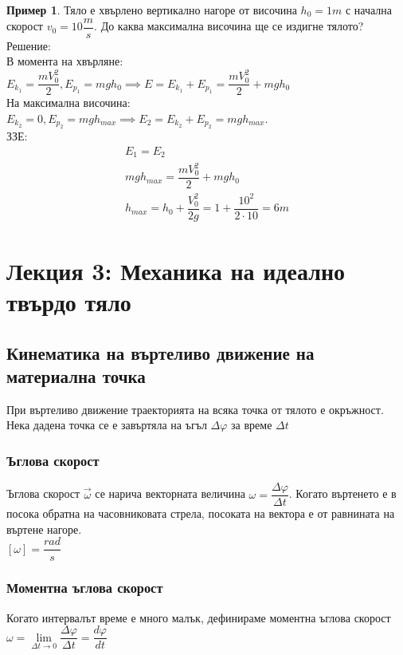 \documentclass[fleqn, 12pt]{article}
\theoremstyle{definition}
\newtheorem{example}{Пример}[subsection]
\begin{document}
\begin{example}
Тяло е хвърлено вертикално нагоре от височина $h_0 =  1m$ с начална скорост $v_0 = 10 \dfrac{m}{s}$. До каква максимална височина ще се издигне тялото?\\
Решение:\\
В момента на хвърляне: \\
$E_{k_1} = \dfrac{mV_0^2}{2}, E_{p_1} = mgh_0 \implies E = E_{k_1} + E_{p_1} =  \dfrac{mV_0^2}{2} + mgh_0 $ \\
На максимална височина: \\
$E_{k_2} = 0 , E_{p_2} = mgh_{max} \implies E_2 = E_{k_2} + E_{p_2} =  mgh_{max} $. \\
ЗЗЕ: 
\begin{gather*}
E_1 = E_2\\
mgh_{max} = \dfrac{mV_0^2}{2} + mgh_0  \\
h_{max} = h_0 + \dfrac{V_0^2}{2g} = 1 + \dfrac{10^2}{2 \cdot 10} = 6m
\end{gather*}
\end{example}


\newpage
\section{Лекция 3: Механика на идеално твърдо тяло}

\subsection{Кинематика на въртеливо движение на материална точка}
При въртеливо движение траекторията на всяка точка от тялото е окръжност. Нека дадена точка се е завъртяла на ъгъл $\Delta \varphi$
за време $\Delta t$

\subsubsection{Ъглова скорост}
Ъглова скорост $\vec{\omega}$ се нарича векторната величина $\omega = \dfrac{\Delta \varphi}{\Delta t}$. Когато въртенето е в посока обратна на часовниковата стрела, посоката на вектора е от равнината на въртене нагоре. \\
$\left[ \omega \right] = \dfrac{rad}{s}$

\subsubsection{Моментна ъглова скорост}
Когато интервалът време е много малък, дефинираме моментна ъглова скорост $\omega = \lim\limits_{\Delta t \rightarrow 0} \dfrac{\Delta \varphi}{\Delta t} = \dfrac{d \varphi}{dt}$
\end{document}
